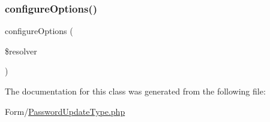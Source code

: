 \mbox{\label{class_app_1_1_form_1_1_password_update_type_a8ff68a86f5090b5df973286836e46ead}} 
\subsubsection{\texorpdfstring{configureOptions()}{configureOptions()}}
{\footnotesize\ttfamily configure\+Options (\begin{DoxyParamCaption}\item[{Options\+Resolver}]{\$resolver }\end{DoxyParamCaption})}



The documentation for this class was generated from the following file\+:\begin{DoxyCompactItemize}
\item 
Form/\mbox{\hyperlink{_password_update_type_8php}{Password\+Update\+Type.\+php}}\end{DoxyCompactItemize}
